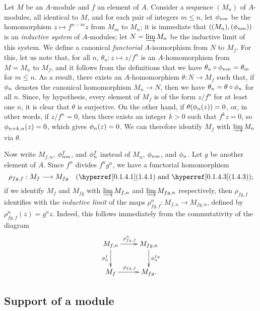 \begin{env}[1.6.1]
\label{0.1.6.1}
Let $M$ be an $A$-module and $f$ an element of $A$.
Consider a sequence $(M_n)$ of $A$-modules, all identical to $M$, and for each pair of integers $m\leq n$, let $\phi_{nm}$ be the homomorphism $z\mapsto f^{n-m}z$ from $M_m$ to $M_n$; it is immediate that $((M_n),(\phi_{nm}))$ is an \emph{inductive system} of $A$-modules; let $N=\varinjlim M_n$ be the inductive limit of this system.
We define a canonical \emph{functorial} $A$-isomorphism from $N$ to $M_f$.
For this, let us note that, for all $n$, $\theta_n:z\mapsto z/f^n$ is an $A$-homomorphism from $M=M_n$ to $M_f$, and it follows from the definitions that we have $\theta_n\circ\phi_{nm}=\theta_m$ for $m\leq n$.
As a result, there exists an $A$-homomorphism $\theta:N\to M_f$ such that, if $\phi_n$ denotes the canonical homomorphism $M_n\to N$, then we have $\theta_n=\theta\circ\phi_n$ for all $n$.
Since, by hypothesis, every element of $M_f$ is of the form $z/f^n$ for at least one $n$, it is clear that $\theta$ is surjective.
On the other hand, if $\theta(\phi_n(z))=0$, or, in other words, if $z/f^n=0$, then there exists an integer $k>0$ such that $f^k z=0$, so $\phi_{n+k,n}(z)=0$, which gives $\phi_n(z)=0$.
We can therefore identify $M_f$ with $\varinjlim M_n$ via $\theta$.
\end{env}

\begin{env}[1.6.2]
\label{0.1.6.2}
Now write $M_{f,n}$, $\phi_{nm}^f$, and $\phi_n^f$ instead of $M_n$, $\phi_{nm}$, and $\phi_n$.
Let $g$ be another element of $A$.
Since $f^n$ divides $f^n g^n$, we have a functorial homomorphism
\[
  \rho_{fg,f}:M_f\to M_{fg}\quad(\sref{0.1.4.1}\text{ and }\sref{0.1.4.3});
\]
if
we identify $M_f$ and $M_{fg}$ with $\varinjlim M_{f,n}$ and $\varinjlim M_{fg,n}$ respectively, then $\rho_{fg,f}$ identifies with the \emph{inductive limit} of the maps $\rho_{fg,f}^n:M_{f,n}\to M_{fg,n}$, defined by $\rho_{fg,f}^n(z)=g^n z$.
Indeed, this follows immediately from the commutativity of the diagram
\[
  \xymatrix{
    M_{f,n}\ar[r]^{\rho_{fg,f}^n}\ar[d]_{\vphi_n^f} &
    M_{fg,n}\ar[d]^{\vphi_n^{fg}}\\
    M_f\ar[r]^{\rho_{fg,f}} &
    M_{fg}.
  }
\]
\end{env}

\subsection{Support of a module}
\label{subsection:0.1.7}


